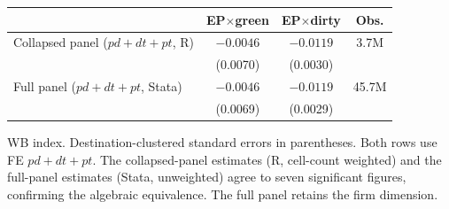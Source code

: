 \small
\begin{threeparttable}
\begin{tabular}{lccc}
\toprule
 & EP$\times$green & EP$\times$dirty & Obs. \\
\midrule
Collapsed panel ($pd+dt+pt$, R) & $-0.0046$ & $-0.0119$ & 3.7M \\
& (0.0070) & (0.0030) & \\
Full panel ($pd+dt+pt$, Stata) & $-0.0046$ & $-0.0119$ & 45.7M \\
& (0.0069) & (0.0029) & \\
\bottomrule
\end{tabular}
\begin{tablenotes}\footnotesize
\item WB index. Destination-clustered standard errors in parentheses. Both rows
use FE $pd+dt+pt$. The collapsed-panel estimates (R, cell-count weighted) and the
full-panel estimates (Stata, unweighted) agree to seven significant figures,
confirming the algebraic equivalence. The full panel retains the firm dimension.
\end{tablenotes}
\end{threeparttable}
